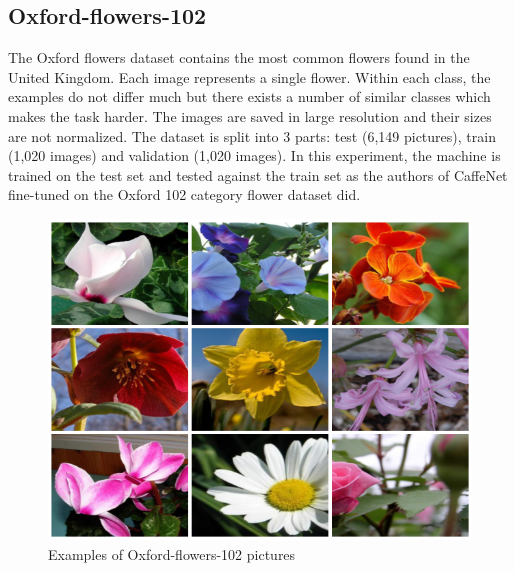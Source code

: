 \documentclass[licencjacka]{pracamgr}
\begin{document}
 		\subsection{Oxford-flowers-102}
 		The Oxford flowers dataset contains the most common flowers found in the United Kingdom. Each image represents a single flower. Within each class, the examples do not differ much but there exists a number of similar classes which makes the task harder. The images are saved in large resolution and their sizes are not normalized. The dataset is split into 3 parts: test (6,149 pictures), train (1,020 images) and validation (1,020 images). In this experiment, the machine is trained on the test set and tested against the train set as the authors of CaffeNet fine-tuned on the Oxford 102 category flower dataset did.
 			\begin{figure}[h]
				\caption{Examples of Oxford-flowers-102 pictures}
				\centering
				\includegraphics[width=\textwidth]{images/flowers}
			\end{figure}
\end{document}
